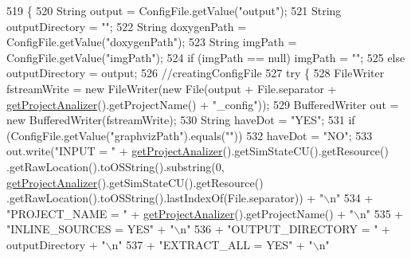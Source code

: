 \begin{DoxyCode}
519                                       \{
520         String output = ConfigFile.getValue(\textcolor{stringliteral}{"output"});
521         String outputDirectory = \textcolor{stringliteral}{""};
522         String doxygenPath = ConfigFile.getValue(\textcolor{stringliteral}{"doxygenPath"});
523         String imgPath = ConfigFile.getValue(\textcolor{stringliteral}{"imgPath"});
524         \textcolor{keywordflow}{if} (imgPath == null)    imgPath = \textcolor{stringliteral}{""};
525         \textcolor{keywordflow}{else}    outputDirectory = output;
526         \textcolor{comment}{//creatingConfigFile}
527         \textcolor{keywordflow}{try} \{
528             FileWriter fstreamWrite = \textcolor{keyword}{new} FileWriter(\textcolor{keyword}{new} File(output + File.separator + 
      \hyperlink{classit_1_1isislab_1_1masonhelperdocumentation_1_1analizer_1_1_global_utility_af6bcca0c06ec6fa8c2b2b88f5050914c}{getProjectAnalizer}().getProjectName() + \textcolor{stringliteral}{"\_config"}));
529             BufferedWriter out = \textcolor{keyword}{new} BufferedWriter(fstreamWrite);
530             String haveDot = \textcolor{stringliteral}{"YES"};
531             \textcolor{keywordflow}{if} (ConfigFile.getValue(\textcolor{stringliteral}{"graphvizPath"}).equals(\textcolor{stringliteral}{""}))
532                 haveDot = \textcolor{stringliteral}{"NO"};
533             out.write(\textcolor{stringliteral}{"INPUT = "} + \hyperlink{classit_1_1isislab_1_1masonhelperdocumentation_1_1analizer_1_1_global_utility_af6bcca0c06ec6fa8c2b2b88f5050914c}{getProjectAnalizer}().getSimStateCU().getResource()
      .getRawLocation().toOSString().substring(0, \hyperlink{classit_1_1isislab_1_1masonhelperdocumentation_1_1analizer_1_1_global_utility_af6bcca0c06ec6fa8c2b2b88f5050914c}{getProjectAnalizer}().getSimStateCU().getResource()
      .getRawLocation().toOSString().lastIndexOf(File.separator)) + \textcolor{stringliteral}{"\(\backslash\)n"}
534                     + \textcolor{stringliteral}{"PROJECT\_NAME = "} + \hyperlink{classit_1_1isislab_1_1masonhelperdocumentation_1_1analizer_1_1_global_utility_af6bcca0c06ec6fa8c2b2b88f5050914c}{getProjectAnalizer}().getProjectName() + \textcolor{stringliteral}{"\(\backslash\)n"}
535                     + \textcolor{stringliteral}{"INLINE\_SOURCES = YES"} + \textcolor{stringliteral}{"\(\backslash\)n"}
536                     + \textcolor{stringliteral}{"OUTPUT\_DIRECTORY = "} + outputDirectory + \textcolor{stringliteral}{"\(\backslash\)n"}
537                     + \textcolor{stringliteral}{"EXTRACT\_ALL = YES"} + \textcolor{stringliteral}{"\(\backslash\)n"}

\end{DoxyCode}
